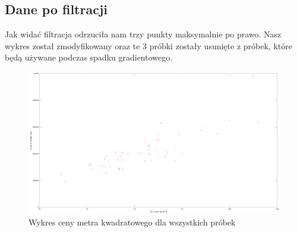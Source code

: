 	\subsection{Dane po filtracji}
	
Jak widać filtracja odrzuciła nam trzy punkty maksymalnie po prawo. Nasz wykres został zmodyfikowany oraz te 3 próbki zostały usunięte z próbek, które będą używane podczas spadku gradientowego.\\


	\begin{figure}[H]
    \centering
    \includegraphics[scale=0.20]{PNG/y_X_filtracja.png}
    \caption{Wykres ceny metra kwadratowego dla wszystkich próbek}
    \label{lamana}
	\end{figure}
	

